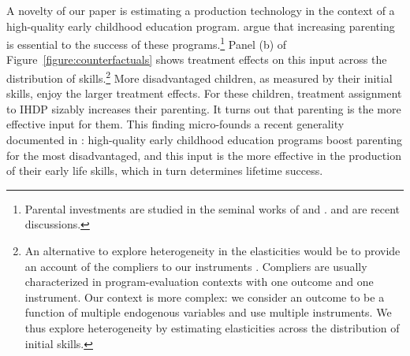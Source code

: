 A novelty of our paper is estimating a production technology in the context of a high-quality early childhood education program. \citet{garciaParentingPromotesSocial2023} argue that increasing parenting is essential to the success of these programs.\footnote{Parental investments are studied in the seminal works of \citet{beckerEquilibriumTheoryDistribution1979a,beckerHumanCapitalRise1986a} and \citet{behrmanParentalPreferencesProvision1982}. \citet{doepkeEconomicsParenting2019} and \citet{francesconiChildDevelopmentParental2016} are recent discussions.} Panel (b) of Figure~\ref{figure:counterfactuals} shows treatment effects on this input across the distribution of skills.\footnote{\label{footnote:abadie}An alternative to explore heterogeneity in the elasticities would be to provide an account of the compliers to our instruments \citep[e.g.,][]{abadieSemiparametricInstrumentalVariable2003}. Compliers are usually characterized in program-evaluation contexts with one outcome and one instrument. Our context is more complex: we consider an outcome to be a function of multiple endogenous variables and use multiple instruments. We thus explore heterogeneity by estimating elasticities across the distribution of initial skills.} More disadvantaged children, as measured by their initial skills, enjoy the larger treatment effects. For these children, treatment assignment to IHDP sizably increases their parenting. It turns out that parenting is the more effective input for them. This finding micro-founds a recent generality documented in \citet{garciaParentingPromotesSocial2023}: high-quality early childhood education programs boost parenting for the most disadvantaged, and this input is the more effective in the production of their early life skills, which in turn determines lifetime success. 


